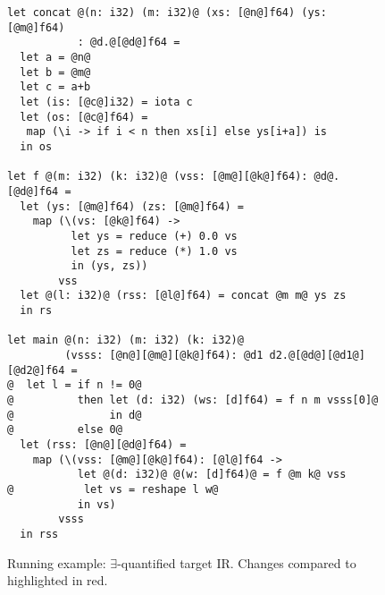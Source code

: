 \begin{figure}
\begin{lstlisting}
let concat @(n: i32) (m: i32)@ (xs: [@n@]f64) (ys: [@m@]f64)
           : @d.@[@d@]f64 =
  let a = @n@
  let b = @m@
  let c = a+b
  let (is: [@c@]i32) = iota c
  let (os: [@c@]f64) =
   map (\i -> if i < n then xs[i] else ys[i+a]) is
  in os

let f @(m: i32) (k: i32)@ (vss: [@m@][@k@]f64): @d@.[@d@]f64 =
  let (ys: [@m@]f64) (zs: [@m@]f64) =
    map (\(vs: [@k@]f64) ->
          let ys = reduce (+) 0.0 vs
          let zs = reduce (*) 1.0 vs
          in (ys, zs))
        vss
  let @(l: i32)@ (rss: [@l@]f64) = concat @m m@ ys zs
  in rs

let main @(n: i32) (m: i32) (k: i32)@
         (vsss: [@n@][@m@][@k@]f64): @d1 d2.@[@d@][@d1@][@d2@]f64 =
@  let l = if n != 0@
@          then let (d: i32) (ws: [d]f64) = f n m vsss[0]@
@               in d@
@          else 0@
  let (rss: [@n@][@d@]f64) =
    map (\(vss: [@m@][@k@]f64): [@l@]f64 ->
           let @(d: i32)@ @(w: [d]f64)@ = f @m k@ vss
@           let vs = reshape l w@
           in vs)
        vsss
  in rss
\end{lstlisting}

  \caption{Running example:
    $\exists$-quantified target IR.  Changes compared to
     highlighted in red.}
\label{fig:RunEgTgt}
\end{figure}


